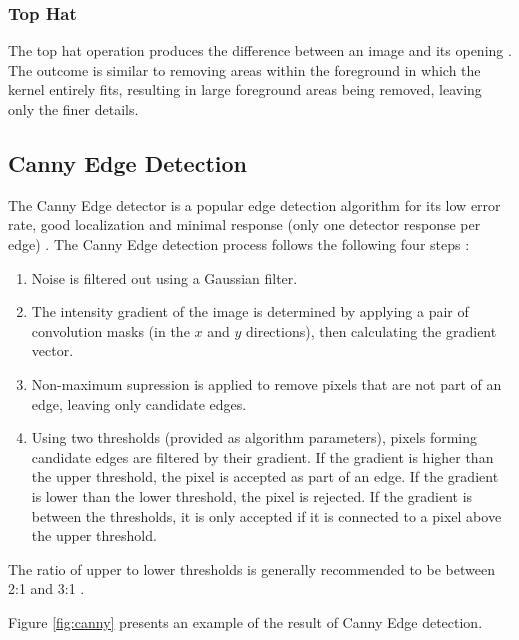 \subsubsection*{Top Hat}

The top hat operation produces the difference between an image and its opening \cite{opencv_mt}. The outcome is similar to removing areas within the foreground in which the kernel entirely fits, resulting in large foreground areas being removed, leaving only the finer details.

\subsection{Canny Edge Detection}

The Canny Edge detector is a popular edge detection algorithm for its low error rate, good localization and minimal response (only one detector response per edge) \cite{opencv_canny}. The Canny Edge detection process follows the following four steps \cite{opencv_canny}:
\begin{enumerate}
  \item Noise is filtered out using a Gaussian filter.

  \item The intensity gradient of the image is determined by applying a pair of convolution masks (in the $x$ and $y$ directions), then calculating the gradient vector.

  \item Non-maximum supression is applied to remove pixels that are not part of an edge, leaving only candidate edges.

  \item Using two thresholds (provided as algorithm parameters), pixels forming candidate edges are filtered by their gradient. If the gradient is higher than the upper threshold, the pixel is accepted as part of an edge. If the gradient is lower than the lower threshold, the pixel is rejected. If the gradient is between the thresholds, it is only accepted if it is connected to a pixel above the upper threshold.

\end{enumerate}

The ratio of upper to lower thresholds is generally recommended to be between 2:1 and 3:1 \cite{opencv_canny}.

\newpage

Figure \ref{fig:canny} presents an example of the result of Canny Edge detection.

